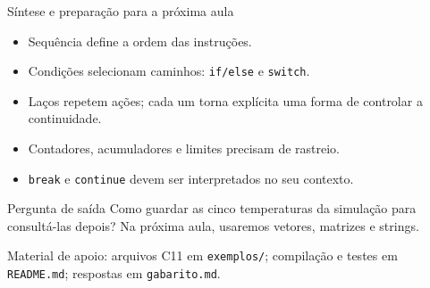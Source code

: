 \begin{frame}{Síntese e preparação para a próxima aula}
\begin{itemize}
\item Sequência define a ordem das instruções.
\item Condições selecionam caminhos: \texttt{if/else} e \texttt{switch}.
\item Laços repetem ações; cada um torna explícita uma forma de controlar a continuidade.
\item Contadores, acumuladores e limites precisam de rastreio.
\item \texttt{break} e \texttt{continue} devem ser interpretados no seu contexto.
\end{itemize}
\begin{block}{Pergunta de saída}
Como guardar as cinco temperaturas da simulação para consultá-las depois? Na próxima aula, usaremos vetores, matrizes e strings.
\end{block}
\small Material de apoio: arquivos C11 em \texttt{exemplos/}; compilação e testes em \texttt{README.md}; respostas em \texttt{gabarito.md}.
\end{frame}
